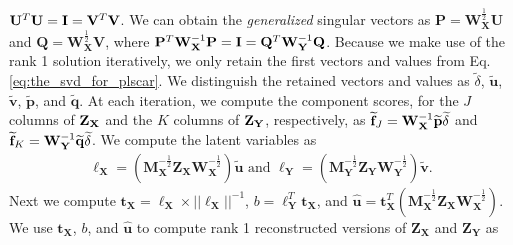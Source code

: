 \documentclass[12pt]{article}
\begin{document}
\({\bf U}^{T}{\bf U} = {\bf I} = {\bf V}^{T}{\bf V}\). We can obtain the
\emph{generalized} singular vectors as
\({\mathbf P} = {\mathbf W}_{{\mathbf X}}^{\frac{1}{2}}{\mathbf U}\) and
\({\mathbf Q} = {\mathbf W}_{{\mathbf X}}^{\frac{1}{2}}{\mathbf V}\),
where
\({\bf P}^{T}{\bf W}_{\bf X}^{-1}{\bf P} = {\bf I} = {\bf Q}^{T}{\bf W}_{\bf Y}^{-1}{\bf Q}\).
Because we make use of the rank 1 solution iteratively, we only retain
the first vectors and values from Eq. \ref{eq:the_svd_for_plscar}. We
distinguish the retained vectors and values as \(\tilde\delta\),
\(\widetilde{\mathbf u}\), \(\widetilde{\mathbf v}\),
\(\widetilde{\mathbf p}\), and \(\widetilde{\mathbf q}\). At each
iteration, we compute the component scores, for the \(J\) columns of
\({\bf Z}_{\bf X}\) and the \(K\) columns of \({\bf Z}_{\bf Y}\),
respectively, as
\(\widetilde{\mathbf f}_{J} = {\bf W}_{\bf X}^{-1}\widetilde{\mathbf p}{\widetilde\delta}\)
and
\(\widetilde{\mathbf f}_{K} = {\bf W}_{\bf Y}^{-1}\widetilde{\mathbf q}{\widetilde\delta}\).
We compute the latent variables as \begin{equation}
\begin{aligned}
{\boldsymbol \ell}_{\mathbf X} = ({\mathbf M}_{\mathbf X}^{-\frac{1}{2}}{\mathbf Z}_{\mathbf X}{\mathbf W}_{\mathbf X}^{-\frac{1}{2}})\widetilde{\mathbf u} \text{ and } {\boldsymbol \ell}_{\mathbf Y} = ({\mathbf M}_{\mathbf Y}^{-\frac{1}{2}}{\mathbf Z}_{\mathbf Y}{\mathbf W}_{\mathbf Y}^{-\frac{1}{2}})\widetilde{\mathbf v}.
\label{eq:lvs}
\end{aligned}
\end{equation} Next we compute
\({\mathbf t}_{\mathbf X} = {\boldsymbol \ell}_{\mathbf X} \times {{\lvert\lvert {\boldsymbol \ell}_{\mathbf X} \rvert\rvert}^{-1}}\),
\(b = {\boldsymbol \ell}_{\mathbf Y}^{T}{\mathbf t}_{\mathbf X}\), and
\(\widehat{\mathbf u} = {\mathbf t}_{\mathbf X}^{T} ({\mathbf M}_{\mathbf X}^{-\frac{1}{2}}{\mathbf Z}_{\mathbf X}{\mathbf W}_{\mathbf X}^{-\frac{1}{2}})\).
We use \({\mathbf t}_{\mathbf X}\), \(b\), and \(\widehat{\mathbf u}\)
to compute rank 1 reconstructed versions of \({\mathbf Z}_{\mathbf X}\)
and \({\mathbf Z}_{\mathbf Y}\) as
\end{document}
